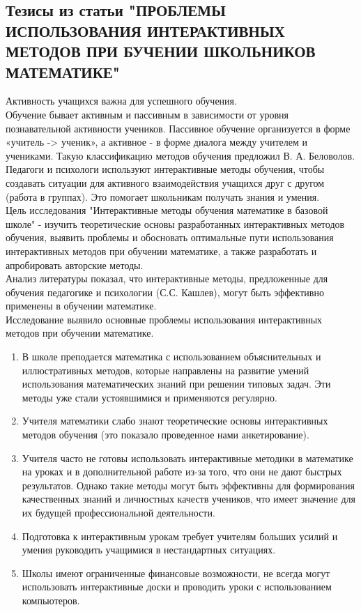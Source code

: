 \subsection*{Тезисы из статьи "ПРОБЛЕМЫ ИСПОЛЬЗОВАНИЯ ИНТЕРАКТИВНЫХ МЕТОДОВ ПРИ  БУЧЕНИИ ШКОЛЬНИКОВ МАТЕМАТИКЕ"}

Активность учащихся важна для успешного обучения.\\

Обучение бывает активным и пассивным в зависимости от уровня познавательной активности учеников. Пассивное обучение организуется в форме «учитель -> ученик», а активное - в форме диалога между учителем и учениками. Такую классификацию методов обучения предложил В. А. Беловолов.\\

Педагоги и психологи используют интерактивные методы обучения, чтобы создавать ситуации для активного взаимодействия учащихся друг с другом (работа в группах). Это помогает школьникам получать знания и умения.\\

Цель исследования "Интерактивные методы обучения математике в базовой школе" - изучить теоретические основы разработанных интерактивных методов обучения, выявить проблемы и обосновать оптимальные пути использования интерактивных методов при обучении математике, а также разработать и апробировать авторские методы.\\

Анализ литературы показал, что интерактивные методы, предложенные для обучения педагогике и психологии (С.С. Кашлев), могут быть эффективно применены в обучении математике.\\

Исследование выявило основные проблемы использования интерактивных методов при обучении математике.\\
\begin{enumerate}
    \item В школе преподается математика с использованием объяснительных и иллюстративных методов, которые направлены на развитие умений использования математических знаний при решении типовых задач. Эти методы уже стали устоявшимися и применяются регулярно.
    \item Учителя математики слабо знают теоретические основы интерактивных методов обучения (это показало проведенное нами анкетирование).
    \item Учителя часто не готовы использовать интерактивные методики в математике на уроках и в дополнительной работе из-за того, что они не дают быстрых результатов. Однако такие методы могут быть эффективны для формирования качественных знаний и личностных качеств учеников, что имеет значение для их будущей профессиональной деятельности.
    \item Подготовка к интерактивным урокам требует учителям больших усилий и умения руководить учащимися в нестандартных ситуациях.
    \item Школы имеют ограниченные финансовые возможности, не всегда могут использовать интерактивные доски и проводить уроки с использованием компьютеров.

\end{enumerate}

